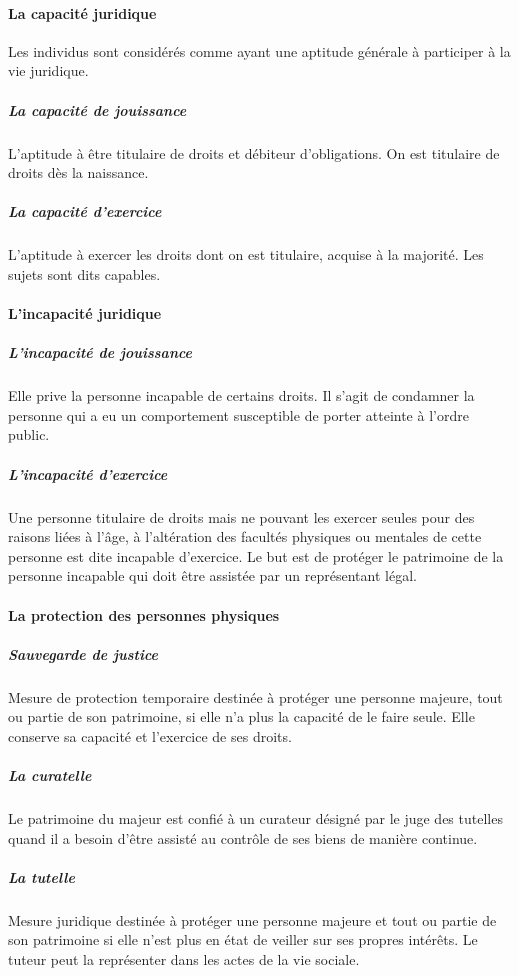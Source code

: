 \documentclass[11pt]{article}
\begin{document}
				\paragraph{La capacité juridique} Les individus sont considérés comme ayant une aptitude générale à participer à la vie juridique.
					\subparagraph{La capacité de jouissance} L'aptitude à être titulaire de droits et débiteur d'obligations. On est titulaire de droits dès la naissance.
					
					\subparagraph{La capacité d'exercice} L'aptitude à exercer les droits dont on est titulaire, acquise à la majorité. Les sujets sont dits capables.
					
				\paragraph{L'incapacité juridique}
					\subparagraph{L'incapacité de jouissance} Elle prive la personne incapable de certains droits. Il s'agit de condamner la personne qui a eu un comportement susceptible de porter atteinte à l'ordre public.
					
					\subparagraph{L'incapacité d'exercice} Une personne titulaire de droits mais ne pouvant les exercer seules pour des raisons liées à l'âge, à l'altération des facultés physiques ou mentales de cette personne est dite incapable d'exercice. Le but est de protéger le patrimoine de la personne incapable qui doit être assistée par un représentant légal.
				
				\paragraph{La protection des personnes physiques}
					\subparagraph{Sauvegarde de justice} Mesure de protection temporaire destinée à protéger une personne majeure, tout ou partie de son patrimoine, si elle n'a plus la capacité de le faire seule. Elle conserve sa capacité et l'exercice de ses droits.
					
					\subparagraph{La curatelle} Le patrimoine du majeur est confié à un curateur désigné par le juge des tutelles quand il a besoin d'être assisté au contrôle de ses biens de manière continue.
					
					\subparagraph{La tutelle} Mesure juridique destinée à protéger une personne majeure et tout ou partie de son patrimoine si elle n'est plus en état de veiller sur ses propres intérêts. Le tuteur peut la représenter dans les actes de la vie sociale.
					
\end{document}
